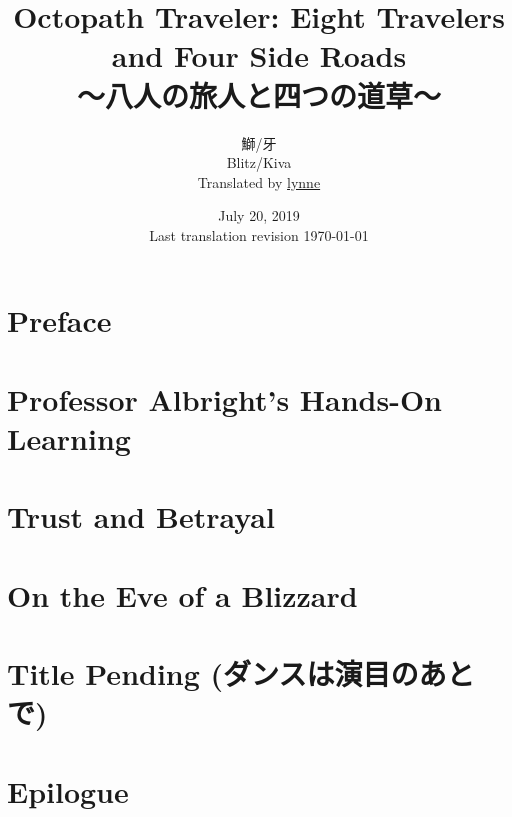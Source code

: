\documentclass[a4paper,11pt]{memoir}
\title{%
Octopath Traveler: Eight Travelers and Four Side Roads \\
\large{～八人の旅人と四つの道草～}
}
\author{%
鰤/牙 \\
Blitz/Kiva \\
Translated by \href{https://lynne.bearblog.dev}{lynne}
}
\date{%
July 20, 2019 \\
Last translation revision \today
}
\begin{document}
	\maketitle
	\pagebreak
	\tableofcontents*
	\frontmatter
	\chapter{Preface}
		
	\mainmatter
	\chapter{Professor Albright's Hands-On Learning}
		
	\chapter{Trust and Betrayal}
		
	\chapter{On the Eve of a Blizzard}
	\chapter{Title Pending (ダンスは演目のあとで)}
	\chapter{Epilogue}
\end{document}

